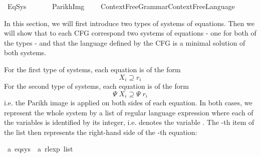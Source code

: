 %
\begin{isabellebody}%
%
%
\isadelimdocument
%
\endisadelimdocument
%
\isatagdocument
%
\isamarkuptrue%
%
\endisatagdocument
{\isafolddocument}%
%
\isadelimdocument
%
\endisadelimdocument
%
\isadelimtheory
%
\endisadelimtheory
%
\isatagtheory
{}\isamarkupfalse%
\ Eq{\isacharunderscore}{\kern0pt}Sys\isanewline
\ \ \isanewline
\ \ \ \ {\isachardoublequoteopen}Parikh{\isacharunderscore}{\kern0pt}Img{\isachardoublequoteclose}\isanewline
\ \ \ \ {\isachardoublequoteopen}Context{\isacharunderscore}{\kern0pt}Free{\isacharunderscore}{\kern0pt}Grammar{\isachardot}{\kern0pt}Context{\isacharunderscore}{\kern0pt}Free{\isacharunderscore}{\kern0pt}Language{\isachardoublequoteclose}\isanewline
{}%
\endisatagtheory
{\isafoldtheory}%
%
\isadelimtheory
%
\endisadelimtheory
%
\begin{isamarkuptext}%
In this section, we will first introduce two types of systems of
equations. Then we will show that to each CFG correspond two systems of equations - one for both
of the types - and that the language defined by the CFG is a minimal solution of both systems.%
\end{isamarkuptext}\isamarkuptrue%
%
\isadelimdocument
%
\endisadelimdocument
%
\isatagdocument
%
\isamarkuptrue%
%
\endisatagdocument
{\isafolddocument}%
%
\isadelimdocument
%
\endisadelimdocument
%
\begin{isamarkuptext}%
For the first type of systems, each equation is of the form
$$X_i \supseteq r_i$$
For the second type of systems, each equation is of the form
$$\Psi \; X_i \supseteq \Psi \; r_i$$
i.e. the Parikh image is applied on both sides of each equation.
In both cases, we represent the whole system by a list of regular language expression where each
of the variables  is identified by its integer, i.e.  denotes the variable
. The -th item of the list then represents the right-hand side  of the -th equation:%
\end{isamarkuptext}\isamarkuptrue%
\isamarkupfalse%
\ {\isacharprime}{\kern0pt}a\ eq{\isacharunderscore}{\kern0pt}sys\ {\isacharequal}{\kern0pt}\ {\isachardoublequoteopen}{\isacharprime}{\kern0pt}a\ rlexp\ list{\isachardoublequoteclose}%

\end{isabellebody}
